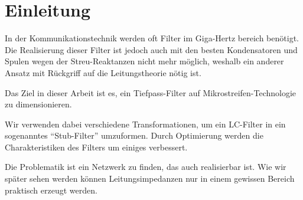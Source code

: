 \section{Einleitung}

In  der  Kommunikationstechnik  werden  oft  Filter  im   Giga-Hertz   bereich
ben\"otigt. Die Realisierung dieser Filter ist  jedoch  auch  mit  den  besten
Kondensatoren und Spulen  wegen  der  Streu-Reaktanzen  nicht  mehr m\"oglich,
weshalb ein anderer Ansatz mit R\"uckgriff auf die Leitungstheorie n\"otig ist.

Das    Ziel    in    dieser   Arbeit   ist   es,   ein   Tiefpass-Filter   auf
Mikrostreifen-Technologie zu dimensionieren.

Wir  verwenden  dabei  verschiedene  Transformationen, um ein LC-Filter in ein
sogenanntes   ``Stub-Filter''   umzuformen.  Durch  Optimierung   werden   die
Charakteristiken des Filters um einiges verbessert.

Die Problematik ist ein Netzwerk zu finden, das auch realisierbar ist. Wie wir
sp\"ater  sehen  werden  k\"onnen Leitungsimpedanzen  nur  in  einem  gewissen
Bereich praktisch erzeugt werden.
